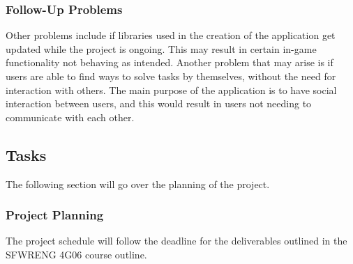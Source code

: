 \documentclass[12pt]{article}
\begin{document}
\subsubsection{Follow-Up Problems}
Other problems include if libraries used in the creation of the application get updated while the project is ongoing. This may result in certain in-game functionality not behaving as intended. Another problem that may arise is if users are able to find ways to solve tasks by themselves, without the need for interaction with others. The main purpose of the application is to have social interaction between users, and this would result in users not needing to communicate with each other.

\subsection{Tasks}
The following section will go over the planning of the project.

\subsubsection{Project Planning}
The project schedule will follow the deadline for the deliverables outlined in the SFWRENG 4G06
course outline.
\end{document}
